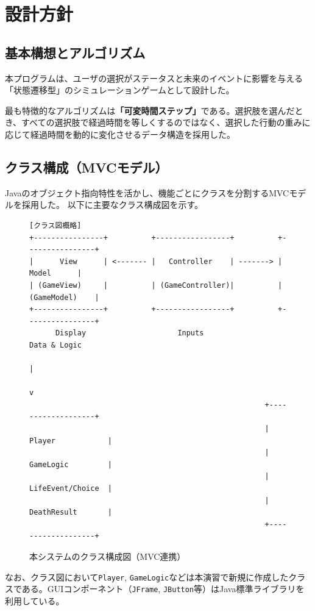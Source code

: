 \documentclass[a4paper,11pt]{jsarticle}
\begin{document}
\section{設計方針}
\subsection{基本構想とアルゴリズム}
本プログラムは、ユーザの選択がステータスと未来のイベントに影響を与える「状態遷移型」のシミュレーションゲームとして設計した。

最も特徴的なアルゴリズムは\textbf{「可変時間ステップ」}である。選択肢を選んだとき、すべての選択肢で経過時間を等しくするのではなく、選択した行動の重みに応じて経過時間を動的に変化させるデータ構造を採用した。

\subsection{クラス構成（MVCモデル）}
Javaのオブジェクト指向特性を活かし、機能ごとにクラスを分割するMVCモデルを採用した。
以下に主要なクラス構成図を示す。

\begin{figure}[H]
\centering
\begin{verbatim}
[クラス図概略]
+----------------+          +-----------------+          +----------------+
|      View      | <------- |   Controller    | -------> |     Model      |
| (GameView)     |          | (GameController)|          | (GameModel)    |
+----------------+          +-----------------+          +----------------+
      Display                     Inputs                    Data & Logic
                                                                |
                                                                v
                                                      +-------------------+
                                                      | Player            |
                                                      | GameLogic         |
                                                      | LifeEvent/Choice  |
                                                      | DeathResult       |
                                                      +-------------------+
\end{verbatim}
\caption{本システムのクラス構成図（MVC連携）}
\end{figure}

なお、クラス図において\texttt{Player}, \texttt{GameLogic}などは本演習で新規に作成したクラスである。GUIコンポーネント（\texttt{JFrame}, \texttt{JButton}等）はJava標準ライブラリを利用している。
\end{document}
